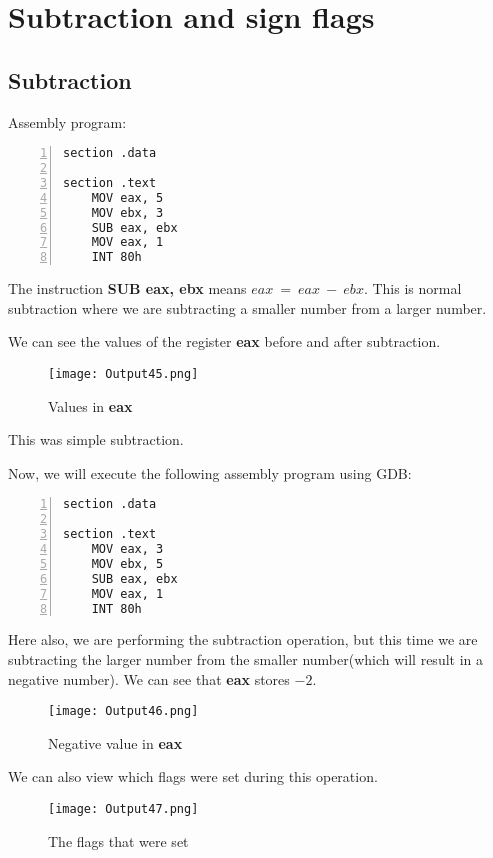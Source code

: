 \documentclass{article}
\makeatletter
\renewcommand\paragraph{\@startsection{paragraph}{4}{\z@}{-3.25ex \@plus -1ex \@minus -.2ex}{1.5ex \@plus .2ex}{\normalfont\normalsize\bfseries}}
\makeatother
\begin{document}
\section{Subtraction and sign flags}\label{sec:sec1}
\subsection{Subtraction}\label{sec:subsec1}
\paragraph{}
Assembly program:
\begin{Verbatim}[numbers=left, frame=single]
section .data

section .text
	MOV eax, 5
	MOV ebx, 3
	SUB eax, ebx
	MOV eax, 1
	INT 80h
\end{Verbatim}
The instruction \textbf{SUB eax, ebx} means $eax\ =\ eax\ -\ ebx$.
This is normal subtraction where we are subtracting a smaller number from a larger number.

We can see the values of the register \textbf{eax} before and after subtraction.

\begin{figure}[h]
\centering
\texttt{[image: Output45.png]}
\caption{Values in \textbf{eax}}
\label{fig:fig1}
\end{figure}

This was simple subtraction.

Now, we will execute the following assembly program using GDB:
\begin{Verbatim}[numbers=left, frame=single]
section .data

section .text
	MOV eax, 3
	MOV ebx, 5
	SUB eax, ebx
	MOV eax, 1
	INT 80h
\end{Verbatim}

Here also, we are performing the subtraction operation, but this time we are subtracting the larger number from the smaller number(which will result in a negative number).
\newpage
We can see that \textbf{eax} stores $-2$.
\begin{figure}[h]
\centering
\texttt{[image: Output46.png]}
\caption{Negative value in \textbf{eax}}
\label{fig:fig2}
\end{figure}

We can also view which flags were set during this operation.
\begin{figure}[h]
\centering
\texttt{[image: Output47.png]}
\caption{The flags that were set}
\label{fig:fig3}
\end{figure}
\end{document}
